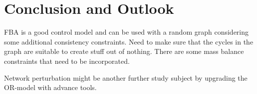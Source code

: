 \chapter{Conclusion and Outlook}
{\color{red}

FBA is a good control model and can be used with a random graph considering some additional consistency constraints. Need to make sure that the cycles in the graph are suitable to create stuff out of nothing. There are some mass balance constraints that need to be incorporated.

Network perturbation might be another further study subject by upgrading the OR-model with advance tools.
 
}